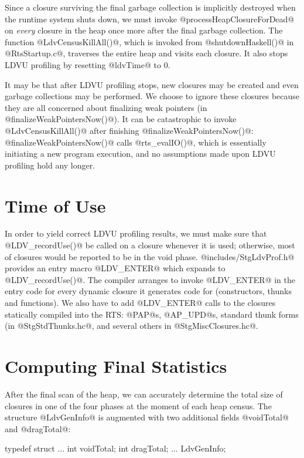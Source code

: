 \documentclass{article}
\begin{document}
Since a closure surviving the final garbage collection is implicitly destroyed
when the runtime system shuts down, we must invoke @processHeapClosureForDead@
on \emph{every} closure in the heap once more after the final garbage collection.
The function @LdvCensusKillAll()@, which is invoked from @shutdownHaskell()@
in @RtsStartup.c@, traverses the entire heap and visits each closure.
It also stops LDVU profiling by resetting @ldvTime@ to $0$. 

It may be that after LDVU profiling stops, new closures may be created
and even garbage collections may be performed.
We choose to ignore these closures because they are all concerned about
finalizing weak pointers (in @finalizeWeakPointersNow()@).
It can be catastrophic to invoke @LdvCensusKillAll()@ after finishing
@finalizeWeakPointersNow()@: @finalizeWeakPointersNow()@ calls
@rts_evalIO()@, which is essentially initiating a new program execution,
and no assumptions made upon LDVU profiling hold any longer. 

\section{Time of Use}

In order to yield correct LDVU profiling results, we must make sure
that @LDV_recordUse()@ be called on a closure whenever it is used;
otherwise, most of closures would be reported to be in the void phase.
@includes/StgLdvProf.h@ provides an entry macro @LDV_ENTER@ which
expands to @LDV_recordUse()@.  The compiler arranges to invoke
@LDV_ENTER@ in the entry code for every dynamic closure it generates
code for (constructors, thunks and functions).  We also have to add
@LDV_ENTER@ calls to the closures statically compiled into the RTS:
@PAP@s, @AP_UPD@s, standard thunk forms (in @StgStdThunks.hc@, and
several others in @StgMiscClosures.hc@.

\section{Computing Final Statistics}

After the final scan of the heap, we can accurately determine the total
size of closures in one of the four phases at the moment of each heap census.
The structure @LdvGenInfo@ is augmented with two additional fields 
@voidTotal@ and @dragTotal@:

\begin{code}
typedef struct {
  ...
  int voidTotal;
  int dragTotal;
  ...
} LdvGenInfo;
\end{code} 
\end{document}
